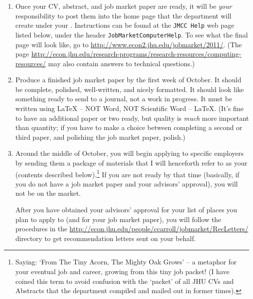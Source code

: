 \documentclass{econtex}
\begin{document}
\begin{enumerate}
\item Once your CV, abstract, and job market paper are ready, it will
  be {\it your} responsibility to post them into the home page that
  the department will create under your \Moniker.
  Instructions can be found at the \texttt{JMCC Help} web page listed
  below, under the header \texttt{JobMarketComputerHelp}.  To see what
  the final page will look like, go to
  \url{http://www.econ2.jhu.edu/jobmarket/2011/}.  (The page
  \url{http://econ.jhu.edu/research-programs/research-resources/computing-resources/}
  may also contain answers to technical questions.)

\item Produce a finished job market paper by the first week of October.  It should
  be complete, polished, well-written, and nicely formatted.  It
  should look like something ready to send to a journal, not a work in
  progress.  It must be written using {\LaTeX} -- NOT Word, NOT Scientific Word -- {\LaTeX}.  (It's fine to have an
  additional paper or two ready, but quality is {\it much} more
  important than quantity; if you have to make a choice between completing a second or third paper, and 
polishing the job market paper, polish.)
  
\item Around the middle of October, you will begin applying to specific employers
  by sending them a package of materials that I will henceforth refer
  to as your {\Acorn} (contents described below).\footnote{Saying: `From
    The Tiny Acorn, The Mighty Oak Grows' -- a metaphor for your eventual
    job and career, growing from this tiny job packet! (I have coined
    this term to avoid confusion with the `packet' of all JHU CVs and Abstracts that the department compiled and mailed out in former times).}  If you are not
  ready by that time (basically, if you do not have a job market paper
  and your advisors' approval), you will not be on the market.
  
  After you have obtained your advisors' approval for your list of
  places you plan to apply to (and for your job market paper), you
  will follow the procedures in the
  \url{http://econ.jhu.edu/people/ccarroll/jobmarket/RecLetters/}
  directory to get recommendation letters sent on your behalf.


\end{enumerate}
\end{document}
